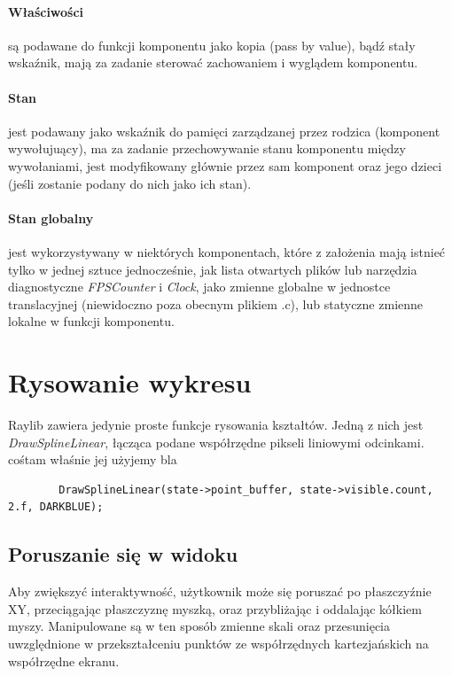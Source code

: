 \documentclass{article}
\begin{document}
	\paragraph{Właściwości} są podawane do funkcji komponentu jako kopia (pass by value), bądź stały wskaźnik, mają za zadanie sterować zachowaniem i wyglądem komponentu.
	\paragraph{Stan} jest podawany jako wskaźnik do pamięci zarządzanej przez rodzica (komponent wywołujuący), ma za zadanie przechowywanie stanu komponentu między wywołaniami, jest modyfikowany głównie przez sam komponent oraz jego dzieci (jeśli zostanie podany do nich jako ich stan).
	\paragraph{Stan globalny} jest wykorzystywany w niektórych komponentach, które z założenia mają istnieć tylko w jednej sztuce jednocześnie, jak lista otwartych plików lub narzędzia diagnostyczne \textit{FPSCounter} i \textit{Clock}, jako zmienne globalne w jednostce translacyjnej (niewidoczno poza obecnym plikiem .c), lub statyczne zmienne lokalne w funkcji komponentu.
	
	
	
	\section{Rysowanie wykresu}
	Raylib zawiera jedynie proste funkcje rysowania kształtów. Jedną z nich jest \textit{DrawSplineLinear}, łącząca podane współrzędne pikseli liniowymi odcinkami. cośtam właśnie jej użyjemy bla
	
	\begin{verbatim}
		DrawSplineLinear(state->point_buffer, state->visible.count, 2.f, DARKBLUE);
	\end{verbatim}
	
	\subsection{Poruszanie się w widoku}
	Aby zwiększyć interaktywność, użytkownik może się poruszać po płaszczyźnie XY, przeciągając płaszczyznę myszką, oraz przybliżając i oddalając kółkiem myszy. Manipulowane są w ten sposób zmienne skali oraz przesunięcia uwzględnione w przekształceniu punktów ze współrzędnych kartezjańskich na współrzędne ekranu.
	
\end{document}
